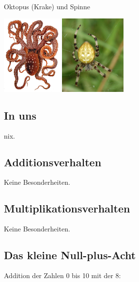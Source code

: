 \documentclass[a4paper]{amsart}
\theoremstyle{definition}
\begin{document}
Oktopus (Krake) und Spinne

\includegraphics[height=4cm]{Octopus.jpg}
\includegraphics[height=4cm]{Spinne.jpg}


\subsection{In uns}
nix.

\subsection{Additionsverhalten}
Keine Besonderheiten.

\subsection{Multiplikationsverhalten}
Keine Besonderheiten.

\subsection{Das kleine Null-plus-Acht}
Addition der Zahlen 0 bis 10 mit der 8:
\vspace{\kategoryVspace}
\end{document}
